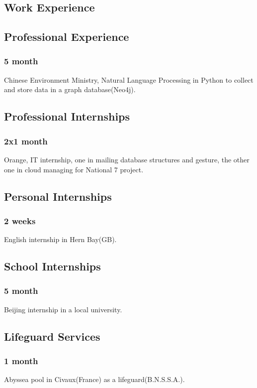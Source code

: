 \documentclass{article}
\begin{document}
    \vspace{1cm}

    \begin{multicols}{2}
        \section{Work Experience}
            \subsection{Professional Experience}
                \subsubsection{5 month}
                    Chinese Environment Ministry, Natural Language Processing in Python to collect and store data in a graph database(Neo4j).
            \subsection{Professional Internships}
                \subsubsection{2x1 month}
                    Orange, IT internship, one in mailing database structures and gesture, the other one in cloud managing for National 7 project.
            \subsection{Personal Internships}
                \subsubsection{2 weeks}
                    English internship in Hern Bay(GB).
            \subsection{School Internships}
                \subsubsection{5 month}
                    Beijing internship in a local university.
            \subsection{Lifeguard Services}
                \subsubsection{1 month}
                    Abyssea pool in Civaux(France) as a lifeguard(B.N.S.S.A.).


\end{multicols}
\end{document}
